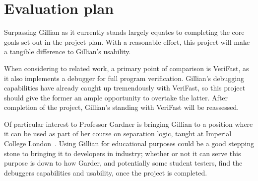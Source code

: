 \chapter{Evaluation plan}
\label{cha:eval}

Surpassing Gillian as it currently stands largely equates to completing the
core goals set out in the project plan. With a reasonable effort, this project
will make a tangible difference to Gillian's usability.

When considering to related work, a primary point of comparison is VeriFast, as
it also implements a debugger for full program verification. Gillian's
debugging capabilities have already caught up tremendously with VeriFast, so
this project should give the former an ample opportunity to overtake the latter.
After completion of the project, Gillian's standing with VeriFast will be
reassessed.

Of particular interest to Professor Gardner is bringing Gillian to a position
where it can be used as part of her course on separation logic, taught at
Imperial College London~\cite{sl-course}. Using Gillian for educational
purposes could be a good stepping stone to bringing it to developers in
industry; whether or not it can serve this purpose is down to how Garder, and
potentially some student testers, find the debuggers capabilities and
usability, once the project is completed.
